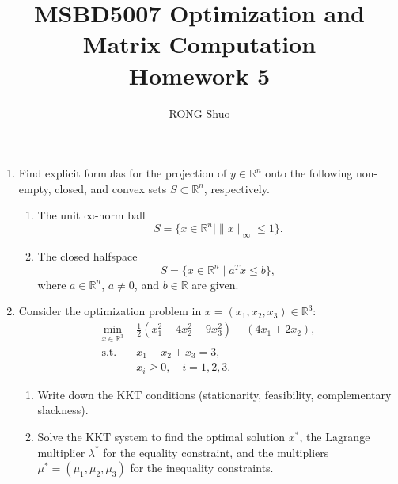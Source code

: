 \documentclass[12pt]{article}
\title{MSBD5007 Optimization and Matrix Computation\\
Homework 5}
\author{RONG Shuo}
\begin{document}
\maketitle

\begin{enumerate}
\item Find explicit formulas for the projection of $y \in \mathbb{R}^n$ onto the following non-empty, closed, and convex sets $S \subset \mathbb{R}^n$, respectively.
    \begin{enumerate}
    \item The unit $\infty$-norm ball
    \[S = \{x \in \mathbb{R}^n \mid \|x\|_\infty \leq 1\}.\]
    \item The closed halfspace
    \[S = \{x \in \mathbb{R}^n \mid a^T x \leq b\},\]
    where $a \in \mathbb{R}^n$, $a \neq 0$, and $b \in \mathbb{R}$ are given.
    \end{enumerate}

\item Consider the optimization problem in $x = (x_1, x_2, x_3) \in \mathbb{R}^3$:
\[\begin{aligned}
\min_{x\in\mathbb{R}^3} &\frac{1}{2}(x_1^2 + 4x_2^2 + 9x_3^2) - (4x_1 + 2x_2),\\
\text{s.t.} \quad &x_1 + x_2 + x_3 = 3,\\
&x_i \geq 0, \quad i = 1, 2, 3.
\end{aligned}\]
    \begin{enumerate}
    \item Write down the KKT conditions (stationarity, feasibility, complementary slackness).
    \item Solve the KKT system to find the optimal solution $x^*$, the Lagrange multiplier $\lambda^*$ for the equality constraint, and the multipliers $\mu^* = (\mu_1, \mu_2, \mu_3)$ for the inequality constraints.
    \end{enumerate}


\end{enumerate}
\end{document}
